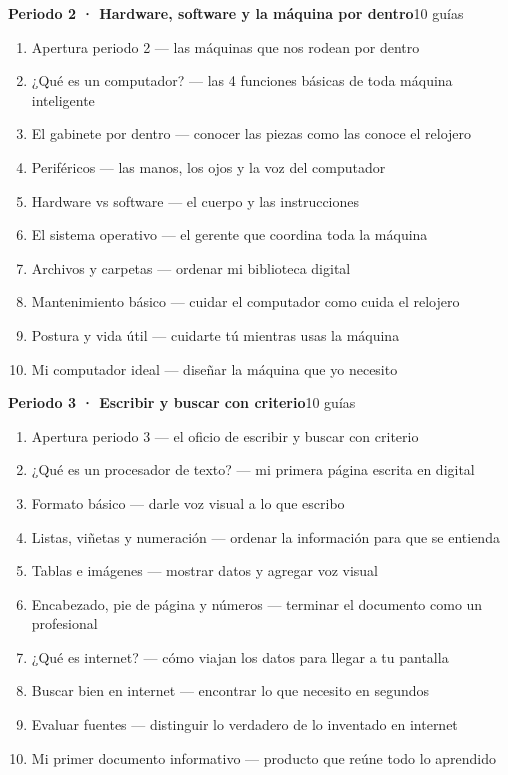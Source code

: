 \noindent\textbf{Periodo 2 · Hardware, software y la máquina por dentro}\hfill{\footnotesize\color{vinoInst}10 guías}\par
\begin{enumerate}[leftmargin=2.6em, itemsep=0.6pt, topsep=2pt, parsep=0pt, label=\footnotesize\arabic*.]
\footnotesize
  \item Apertura periodo 2 --- las máquinas que nos rodean por dentro
  \item ¿Qué es un computador? --- las 4 funciones básicas de toda máquina inteligente
  \item El gabinete por dentro --- conocer las piezas como las conoce el relojero
  \item Periféricos --- las manos, los ojos y la voz del computador
  \item Hardware vs software --- el cuerpo y las instrucciones
  \item El sistema operativo --- el gerente que coordina toda la máquina
  \item Archivos y carpetas --- ordenar mi biblioteca digital
  \item Mantenimiento básico --- cuidar el computador como cuida el relojero
  \item Postura y vida útil --- cuidarte tú mientras usas la máquina
  \item Mi computador ideal --- diseñar la máquina que yo necesito
\end{enumerate}

\noindent\textbf{Periodo 3 · Escribir y buscar con criterio}\hfill{\footnotesize\color{vinoInst}10 guías}\par
\begin{enumerate}[leftmargin=2.6em, itemsep=0.6pt, topsep=2pt, parsep=0pt, label=\footnotesize\arabic*.]
\footnotesize
  \item Apertura periodo 3 --- el oficio de escribir y buscar con criterio
  \item ¿Qué es un procesador de texto? --- mi primera página escrita en digital
  \item Formato básico --- darle voz visual a lo que escribo
  \item Listas, viñetas y numeración --- ordenar la información para que se entienda
  \item Tablas e imágenes --- mostrar datos y agregar voz visual
  \item Encabezado, pie de página y números --- terminar el documento como un profesional
  \item ¿Qué es internet? --- cómo viajan los datos para llegar a tu pantalla
  \item Buscar bien en internet --- encontrar lo que necesito en segundos
  \item Evaluar fuentes --- distinguir lo verdadero de lo inventado en internet
  \item Mi primer documento informativo --- producto que reúne todo lo aprendido
\end{enumerate}

